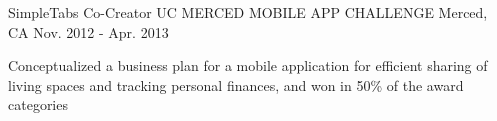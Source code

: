 

\begin{cventries}

  \cventry
    {SimpleTabs Co-Creator} %
    {UC MERCED MOBILE APP CHALLENGE} %
    {Merced, CA} %
    {Nov. 2012 - Apr. 2013} %
    {
      \begin{cvitems} %
        \item {Conceptualized a business plan for a mobile application for efficient sharing of living spaces \newline and tracking personal finances, and won in 50\% of the award categories}
      \end{cvitems}
    }



\end{cventries}
